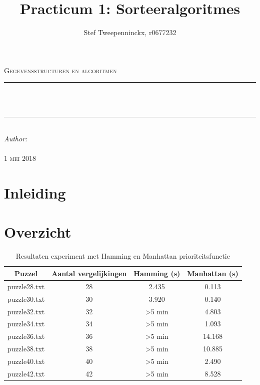 \documentclass[11pt, a4paper]{article}
\author{Stef Tweepenninckx, r0677232}
\title{Practicum 1: Sorteeralgoritmes}
\makeatletter
\def\printtitle{                 
    {\large \@title}}
\def\printauthor{                  
    {\large \@author}}
\makeatother
\begin{document}
\begin{titlepage}
\newcommand{\HRule}{\rule{\linewidth}{0.5mm}} 
\center 
\textsc{\LARGE Gegevensstructuren en algoritmen}\\[1.5cm] 
\HRule \\[0.4cm]

{\huge \bfseries \printtitle}\\[0.4cm] 
\HRule \\[0.4cm]

\Large \emph{Author:}\\
 \textsc{\printauthor}\\[3cm]

{\large \textsc{1 mei 2018}}\\[3cm] 

\vfill 
\end{titlepage}

\section*{Inleiding}


\newpage
\section*{Overzicht}
\begin{table}[ht]
\centering
\label{my-label}
\begin{tabular}{|cccc|}
\hline
Puzzel       & Aantal vergelijkingen & Hamming (s)        & Manhattan (s) \\ \hline
puzzle28.txt & 28                    & 2.435              & 0.113         \\
puzzle30.txt & 30                    & 3.920              & 0.140         \\
puzzle32.txt & 32                    & \textgreater 5 min & 4.803         \\
puzzle34.txt & 34                    & \textgreater 5 min & 1.093         \\
puzzle36.txt & 36                    & \textgreater 5 min & 14.168        \\
puzzle38.txt & 38                    & \textgreater 5 min & 10.885        \\
puzzle40.txt & 40                    & \textgreater 5 min & 2.490         \\
puzzle42.txt & 42                    & \textgreater 5 min & 8.528         \\ \hline
\end{tabular}
\captionsetup{justification=centering,margin=2cm}
\caption{Resultaten experiment met Hamming en Manhattan prioriteitsfunctie}
\end{table}
\end{document}
